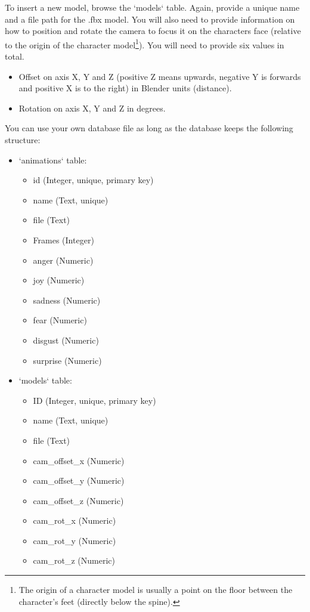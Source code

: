 To insert a new model, browse the `models` table. Again, provide a unique name and a file path for the .fbx model. You will also need to provide information on how to position and rotate the camera to focus it on the characters face (relative to the origin of the character model\footnote{The origin of a character model is usually a point on the floor between the character's feet (directly below the spine).}). You will need to provide six values in total.
\begin{itemize}
	\item Offset on axis X, Y and Z (positive Z means upwards, negative Y is forwards and positive X is to the right) in Blender units (distance).
	\item Rotation on axis X, Y and Z in degrees.
\end{itemize}

\noindent You can use your own database file as long as the database keeps the following structure:
\begin{itemize}
	\item `animations` table:
	
	\begin{itemize}
		\item id (Integer, unique, primary key)
		\item name (Text, unique)
		\item file (Text)
		\item Frames (Integer)
		\item anger (Numeric)
		\item joy (Numeric)
		\item sadness (Numeric)
		\item fear (Numeric)
		\item disgust (Numeric)
		\item surprise (Numeric)
	\end{itemize}

	\item `models` table:
	
	\begin{itemize}
		\item ID (Integer, unique, primary key)
		\item name (Text, unique)
		\item file (Text)
		\item cam\_offset\_x (Numeric)
		\item cam\_offset\_y (Numeric)
		\item cam\_offset\_z (Numeric)
		\item cam\_rot\_x (Numeric)
		\item cam\_rot\_y (Numeric)
		\item cam\_rot\_z (Numeric)
	\end{itemize}
\end{itemize}

